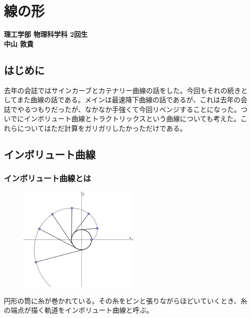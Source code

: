 \chapter{線の形}
\vspace{-45pt} %
\begin{flushright}
  {\bf \large 理工学部 物理科学科 2回生} \\ \vspace{3pt} %
  {\bf \large 中山 敦貴} \\ \vspace{30pt} %
\end{flushright}


%
\section*{はじめに}
去年の会誌ではサインカーブとカテナリー曲線の話をした。今回もそれの続きとしてまた曲線の話である。メインは最速降下曲線の話であるが、これは去年の会誌でやるつもりだったが、なかなか手強くて今回リベンジすることになった。ついでにインボリュート曲線とトラクトリックスという曲線についても考えた。これらについてはただ計算をガリガリしたかっただけである。

\section{インボリュート曲線}

\subsection{インボリュート曲線とは}
\begin{figure}
  \centering
  \includegraphics[width = 6cm]{nakayama1/image/imbo3}
\end{figure}
円形の筒に糸が巻かれている。その糸をピンと張りながらほどいていくとき、糸の端点が描く軌道をインボリュート曲線と呼ぶ。

